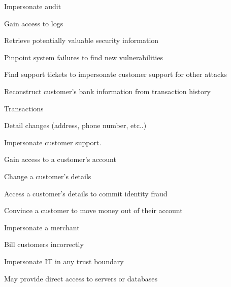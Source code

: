\begin{numbered}
    \item \label{impersonateAudit} Impersonate audit
    \begin{numbered}
        \item Gain access to logs
        \begin{numbered}
            \item Retrieve potentially valuable security information
            \begin{numbered}
                \item Pinpoint system failures to find new vulnerabilities
                \item Find support tickets to impersonate customer support for other attacks
            \end{numbered}

            \item Reconstruct customer’s bank information from transaction history
            \begin{numbered}
                \item Transactions
                \item Detail changes (address, phone number, etc..)
            \end{numbered}
        \end{numbered}
    \end{numbered}
    
    \item \label{impersonateCustomerSupport} Impersonate customer support.
    \begin{numbered}
        \item Gain access to a customer's account
        \item Change a customer's details
        \item Access a customer's details to commit identity fraud
        \item Convince a customer to move money out of their account
    \end{numbered}

    \item \label{impersonateMerchant} Impersonate a merchant
    \begin{numbered}
        \item Bill customers incorrectly
    \end{numbered}

    \item \label{impersonateIt} Impersonate IT in any trust boundary
    \begin{numbered}
        \item May provide direct access to servers or databases
    \end{numbered}


\end{numbered}
